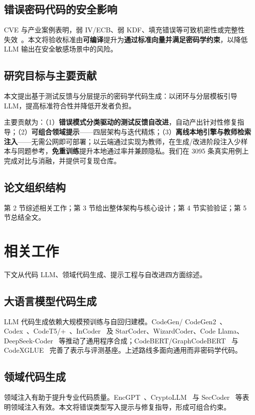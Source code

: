 \documentclass[runningheads]{llncs}
\begin{document}
\subsection{错误密码代码的安全影响}
\label{subsec:security_implications}
CVE 与产业案例表明，弱 IV/ECB、弱 KDF、填充错误等可致机密性或完整性失效~\cite{secsurvey,cryptollm}。本文将验收标准由\textbf{可编译}提升为\textbf{通过标准向量并满足密码学约束}，以降低 LLM 输出在安全敏感场景中的风险。
\subsection{研究目标与主要贡献}
本文提出基于测试反馈与分层提示的密码学代码生成：以闭环与分层模板引导 LLM，提高标准符合性并降低开发者负担。

主要贡献为：（1）\textbf{错误模式分类驱动的测试反馈自改进}，自动产出针对性修复指导；（2）\textbf{可组合领域提示}——四层架构与迭代精炼；（3）\textbf{离线本地引擎与教师检索注入}——无需公网即可部署；以云端通过实现为教师，在生成/改进阶段注入少样本与同题参考，\textbf{免重训练}提升本地通过率并兼顾隐私。我们在 3095 条真实用例上完成对比与消融，并提供可复现仓库。

\subsection{论文组织结构}
第 2 节综述相关工作；第 3 节给出整体架构与核心设计；第 4 节实验验证；第 5 节总结全文。

\section{相关工作}
下文从代码 LLM、领域代码生成、提示工程与自改进四方面综述。

\subsection{大语言模型代码生成}
LLM 代码生成依赖大规模预训练与自回归建模。CodeGen/ CodeGen2~\cite{codegen1,codegen2}、Codex~\cite{codex}、CodeT5/+~\cite{codet5,codet5plus}、InCoder~\cite{incoder} 及 StarCoder、WizardCoder、Code Llama、DeepSeek-Coder~\cite{starcoder,wizardcoder,codellama,deepseekcoder} 等推动了通用程序合成；CodeBERT/GraphCodeBERT~\cite{codebert,graphcodebert} 与 CodeXGLUE~\cite{codexglue} 完善了表示与评测基座。上述路线多面向通用而非密码学代码。

\subsection{领域代码生成}
领域注入有助于提升专业代码质量。EncGPT~\cite{encgpt}、CryptoLLM~\cite{cryptollm} 与 SecCoder~\cite{seccoder} 等表明领域注入有效。本文将错误类型写入提示与修复指导，形成可组合约束。
\end{document}
